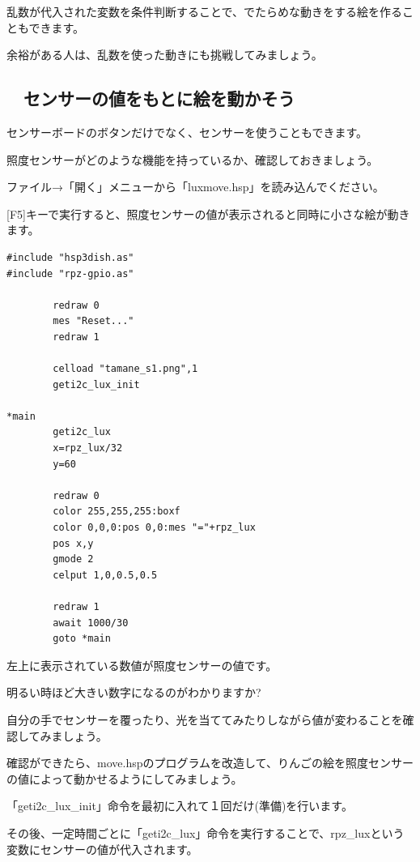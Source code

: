 乱数が代入された変数を条件判断することで、でたらめな動きをする絵を作ることもできます。

余裕がある人は、乱数を使った動きにも挑戦してみましょう。

\newpage
\subsection{\useOmetoiExample　センサーの値をもとに絵を動かそう}

\exampleinduction

センサーボードのボタンだけでなく、センサーを使うこともできます。

照度センサーがどのような機能を持っているか、確認しておきましょう。


ファイル→「開く」メニューから「luxmove.hsp」を読み込んでください。

[F5]キーで実行すると、照度センサーの値が表示されると同時に小さな絵が動きます。

\begin{lstlisting}[caption=luxmove.hspのプログラム]
#include "hsp3dish.as"
#include "rpz-gpio.as"

        redraw 0
        mes "Reset..."
        redraw 1

        celload "tamane_s1.png",1
        geti2c_lux_init

*main
        geti2c_lux
        x=rpz_lux/32
        y=60

        redraw 0
        color 255,255,255:boxf
        color 0,0,0:pos 0,0:mes "="+rpz_lux
        pos x,y
        gmode 2
        celput 1,0,0.5,0.5

        redraw 1
        await 1000/30
        goto *main
\end{lstlisting}

左上に表示されている数値が照度センサーの値です。

明るい時ほど大きい数字になるのがわかりますか?

自分の手でセンサーを覆ったり、光を当ててみたりしながら値が変わることを確認してみましょう。

確認ができたら、move.hspのプログラムを改造して、りんごの絵を照度センサーの値によって動かせるようにしてみましょう。


\exampleanswer


「geti2c\_lux\_init」命令を最初に入れて１回だけ(準備)を行います。

その後、一定時間ごとに「geti2c\_lux」命令を実行することで、rpz\_luxという変数にセンサーの値が代入されます。

